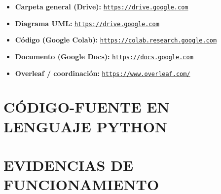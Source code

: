 \documentclass[11pt]{article}
\begin{document}
\begin{itemize}
  \item \textbf{Carpeta general (Drive):}
    \href{https://drive.google.com/drive/folders/1nIY4LP34ZPg8fk4kJ2LFdMDJ417Zf3oI}
         {\nolinkurl{https://drive.google.com}}
  \item \textbf{Diagrama UML:}
    \href{https://drive.google.com/file/d/17fj9S_zEiaoR2zrMGGmN1JwGT5Dy9nQF}
         {\nolinkurl{https://drive.google.com}}
  \item \textbf{Código (Google Colab):}
    \href{https://colab.research.google.com/drive/1onQJxx9BtXw5OUwlhw7OiUK88e6yWuuB}
         {\nolinkurl{https://colab.research.google.com}}
  \item \textbf{Documento (Google Docs):}
    \href{https://docs.google.com/document/d/1KQ9onM5Ge5rgCczQMDyyks0Ff6jJonFbX9TXnuF9RjE}
         {\nolinkurl{https://docs.google.com}}
  \item \textbf{Overleaf / coordinación:}
    \href{https://www.overleaf.com/project/68d4487b8e93ecf1153e9b87}
         {\nolinkurl{https://www.overleaf.com/}}
\end{itemize}

\section{CÓDIGO-FUENTE EN LENGUAJE PYTHON}



\section{EVIDENCIAS DE FUNCIONAMIENTO}
\end{document}
